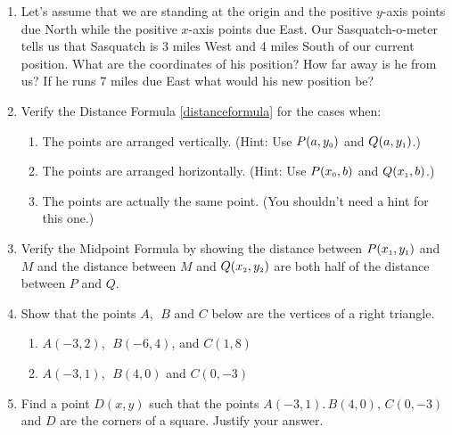 \begin{enumerate}
\setcounter{enumi}{\value{HW}}

\item Let's assume that we are standing at the origin and the positive $y$-axis points due North while the positive $x$-axis points due East.  Our Sasquatch-o-meter tells us that Sasquatch is 3 miles West and 4 miles South of our current position.  What are the coordinates of his position?  How far away is he from us?  If he runs 7 miles due East what would his new position be?

\item \label{distanceothercases} Verify the Distance Formula \ref{distanceformula} for the cases when:

\begin{enumerate}

\item The points are arranged vertically.  (Hint: Use $P(a, y_{\mbox{\tiny$0$}})$ and $Q(a, y_{\mbox{\tiny$1$}})$.)
\item The points are arranged horizontally. (Hint: Use $P(x_{\mbox{\tiny$0$}}, b)$ and $Q(x_{\mbox{\tiny$1$}}, b)$.)
\item The points are actually the same point. (You shouldn't need a hint for this one.)

\end{enumerate}

\item \label{verifymidpointformula} Verify the Midpoint Formula by showing the distance between $P(x_{\mbox{\tiny$1$}}, y_{\mbox{\tiny$1$}})$ and $M$ and the distance between $M$ and $Q(x_{\mbox{\tiny$2$}}, y_{\mbox{\tiny$2$}})$ are both half of the distance between $P$ and $Q$. 

\item Show that the points $A$, $\;B$ and $C$ below are the vertices of a right triangle.

\begin{multicols}{2}

\begin{enumerate}

\item  $A(-3,2)$, $\;B(-6,4)$, and $C(1,8)$

\item   $A(-3, 1)$, $\;B(4, 0)$ and $C(0, -3)$


\end{enumerate}
\end{multicols}

\item Find a point $D(x, y)$ such that the points $A(-3, 1). \, B(4, 0), \, C(0, -3)$ and $D$ are the corners of a square.  Justify your answer.


\end{enumerate}
